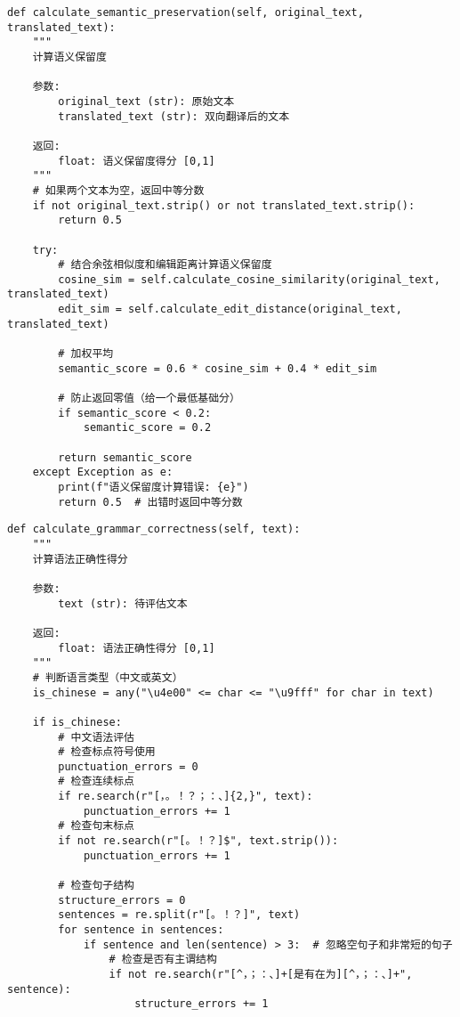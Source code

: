 \documentclass[bwprint]{cumcmthesis}
\begin{document}
\begin{appendices}
\begin{lstlisting}[style=pythonstyle, caption={语义保留度计算方法}]
def calculate_semantic_preservation(self, original_text, translated_text):
    """
    计算语义保留度

    参数:
        original_text (str): 原始文本
        translated_text (str): 双向翻译后的文本

    返回:
        float: 语义保留度得分 [0,1]
    """
    # 如果两个文本为空，返回中等分数
    if not original_text.strip() or not translated_text.strip():
        return 0.5

    try:
        # 结合余弦相似度和编辑距离计算语义保留度
        cosine_sim = self.calculate_cosine_similarity(original_text, translated_text)
        edit_sim = self.calculate_edit_distance(original_text, translated_text)

        # 加权平均
        semantic_score = 0.6 * cosine_sim + 0.4 * edit_sim

        # 防止返回零值（给一个最低基础分）
        if semantic_score < 0.2:
            semantic_score = 0.2

        return semantic_score
    except Exception as e:
        print(f"语义保留度计算错误: {e}")
        return 0.5  # 出错时返回中等分数
\end{lstlisting}

\begin{lstlisting}[style=pythonstyle, caption={语法正确性计算方法}]
def calculate_grammar_correctness(self, text):
    """
    计算语法正确性得分

    参数:
        text (str): 待评估文本

    返回:
        float: 语法正确性得分 [0,1]
    """
    # 判断语言类型（中文或英文）
    is_chinese = any("\u4e00" <= char <= "\u9fff" for char in text)

    if is_chinese:
        # 中文语法评估
        # 检查标点符号使用
        punctuation_errors = 0
        # 检查连续标点
        if re.search(r"[，。！？；：、]{2,}", text):
            punctuation_errors += 1
        # 检查句末标点
        if not re.search(r"[。！？]$", text.strip()):
            punctuation_errors += 1

        # 检查句子结构
        structure_errors = 0
        sentences = re.split(r"[。！？]", text)
        for sentence in sentences:
            if sentence and len(sentence) > 3:  # 忽略空句子和非常短的句子
                # 检查是否有主谓结构
                if not re.search(r"[^，；：、]+[是有在为][^，；：、]+", sentence):
                    structure_errors += 1


\end{lstlisting}
\end{appendices}
\end{document}
